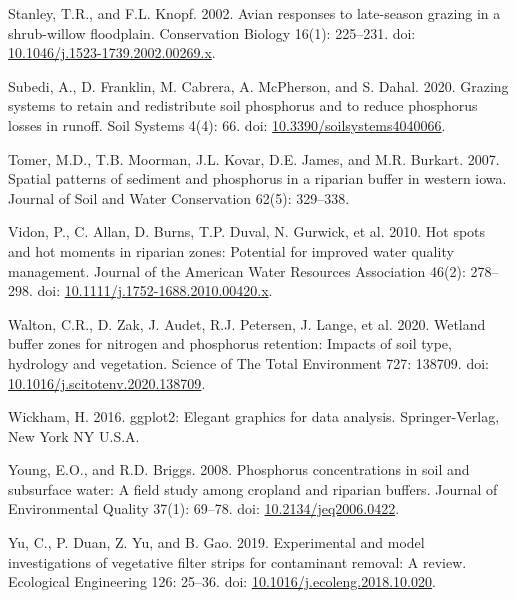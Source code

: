 \documentclass[
]{agujournal2019}
\newlength{\cslhangindent}
\newenvironment{CSLReferences}[2] %
 {\begin{list}{}{%
  \setlength{\itemindent}{0pt}
  \setlength{\leftmargin}{0pt}
  \setlength{\parsep}{0pt}
  \ifodd #1
   \setlength{\leftmargin}{\cslhangindent}
   \setlength{\itemindent}{-1\cslhangindent}
  \fi
  \setlength{\itemsep}{#2\baselineskip}}}
 {\end{list}}
\begin{document}
\begin{CSLReferences}{1}{1}
Stanley, T.R., and F.L. Knopf. 2002. Avian responses to late-season
grazing in a shrub-willow floodplain. Conservation Biology 16(1):
225--231. doi:
\href{https://doi.org/10.1046/j.1523-1739.2002.00269.x}{10.1046/j.1523-1739.2002.00269.x}.

Subedi, A., D. Franklin, M. Cabrera, A. McPherson, and S. Dahal. 2020.
Grazing systems to retain and redistribute soil phosphorus and to reduce
phosphorus losses in runoff. Soil Systems 4(4): 66. doi:
\href{https://doi.org/10.3390/soilsystems4040066}{10.3390/soilsystems4040066}.

Tomer, M.D., T.B. Moorman, J.L. Kovar, D.E. James, and M.R. Burkart.
2007. Spatial patterns of sediment and phosphorus in a riparian buffer
in western iowa. Journal of Soil and Water Conservation 62(5): 329--338.

Vidon, P., C. Allan, D. Burns, T.P. Duval, N. Gurwick, et al. 2010. Hot
spots and hot moments in riparian zones: Potential for improved water
quality management. Journal of the American Water Resources Association
46(2): 278--298. doi:
\href{https://doi.org/10.1111/j.1752-1688.2010.00420.x}{10.1111/j.1752-1688.2010.00420.x}.

Walton, C.R., D. Zak, J. Audet, R.J. Petersen, J. Lange, et al. 2020.
Wetland buffer zones for nitrogen and phosphorus retention: Impacts of
soil type, hydrology and vegetation. Science of The Total Environment
727: 138709. doi:
\href{https://doi.org/10.1016/j.scitotenv.2020.138709}{10.1016/j.scitotenv.2020.138709}.

Wickham, H. 2016. ggplot2: Elegant graphics for data analysis.
Springer-Verlag, New York NY U.S.A.

Young, E.O., and R.D. Briggs. 2008. Phosphorus concentrations in soil
and subsurface water: A field study among cropland and riparian buffers.
Journal of Environmental Quality 37(1): 69--78. doi:
\href{https://doi.org/10.2134/jeq2006.0422}{10.2134/jeq2006.0422}.

Yu, C., P. Duan, Z. Yu, and B. Gao. 2019. Experimental and model
investigations of vegetative filter strips for contaminant removal: A
review. Ecological Engineering 126: 25--36. doi:
\href{https://doi.org/10.1016/j.ecoleng.2018.10.020}{10.1016/j.ecoleng.2018.10.020}.

\end{CSLReferences}
\end{document}
